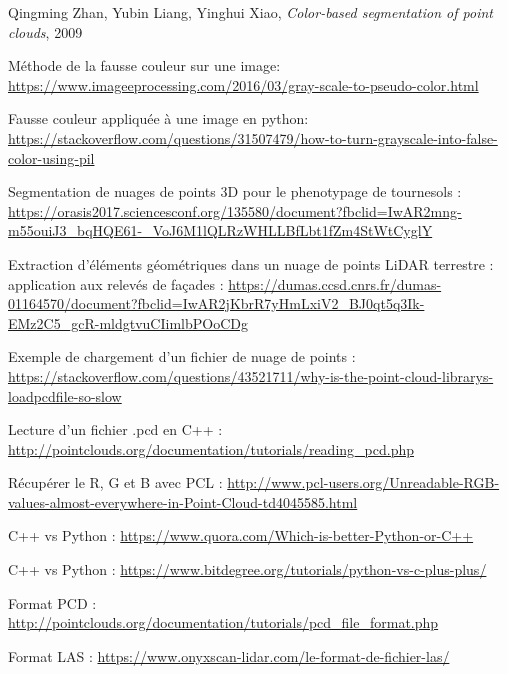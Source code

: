 \documentclass[12pt,titlepage,french]{article}
\newcounter{firstbib}
\begin{document}
\renewcommand{\refname}{Fausse couleur}
\begin{thebibliography}{3}
 Qingming Zhan, Yubin Liang, Yinghui Xiao, \textit{Color-based segmentation of point clouds}, 2009

 Méthode de la fausse couleur sur une image:
\url{https://www.imageeprocessing.com/2016/03/gray-scale-to-pseudo-color.html}

 Fausse couleur appliquée à une image en python:
\url{https://stackoverflow.com/questions/31507479/how-to-turn-grayscale-into-false-color-using-pil}

\setcounter{firstbib}{\value{enumiv}}
\end{thebibliography}


\renewcommand{\refname}{C++}
\begin{thebibliography}{3}
\setcounter{enumiv}{\value{firstbib}}

 Segmentation de nuages de points 3D pour le phenotypage de tournesols :
\url{https://orasis2017.sciencesconf.org/135580/document?fbclid=IwAR2mng-m55ouiJ3_bqHQE61-_VoJ6M1lQLRzWHLLBfLbt1fZm4StWtCyglY}

 Extraction d'éléments géométriques dans un nuage de points LiDAR terrestre : application aux relevés de façades :
\url{https://dumas.ccsd.cnrs.fr/dumas-01164570/document?fbclid=IwAR2jKbrR7yHmLxiV2_BJ0qt5q3Ik-EMz2C5_gcR-mldgtvuCIimlbPOoCDg}

 Exemple de chargement d'un fichier de nuage de points :
\url{https://stackoverflow.com/questions/43521711/why-is-the-point-cloud-librarys-loadpcdfile-so-slow}

 Lecture d'un fichier .pcd en C++ :
\url{http://pointclouds.org/documentation/tutorials/reading_pcd.php}

 Récupérer le R, G et B avec PCL :
\url{http://www.pcl-users.org/Unreadable-RGB-values-almost-everywhere-in-Point-Cloud-td4045585.html}

\setcounter{firstbib}{\value{enumiv}}
\end{thebibliography}


\renewcommand{\refname}{Comparaison C++/Python}
\begin{thebibliography}{3}
\setcounter{enumiv}{\value{firstbib}}

 C++ vs Python :
\url{https://www.quora.com/Which-is-better-Python-or-C++}

 C++ vs Python :
\url{https://www.bitdegree.org/tutorials/python-vs-c-plus-plus/}

\setcounter{firstbib}{\value{enumiv}}
\end{thebibliography}


\renewcommand{\refname}{Formats de fichier}
\begin{thebibliography}{3}
\setcounter{enumiv}{\value{firstbib}}

 Format PCD :
\url{http://pointclouds.org/documentation/tutorials/pcd_file_format.php}

 Format LAS :
\url{https://www.onyxscan-lidar.com/le-format-de-fichier-las/ }

\setcounter{firstbib}{\value{enumiv}}
\end{thebibliography}
\end{document}
